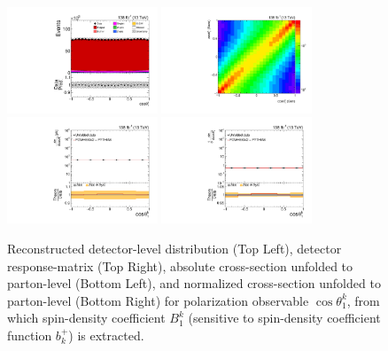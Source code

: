 \clearpage
\begin{figure}[htb]
\begin{center}
 \includegraphics[width=0.40\textwidth]{fig_fullRun2UL/controlplots/combined/Hyp_AntiLeptonBk.pdf}
 \includegraphics[width=0.40\textwidth]{fig_fullRun2UL/unfolding/combined/ResponseMatrix_b1k.pdf} \\
 \includegraphics[width=0.40\textwidth]{fig_fullRun2UL/unfolding/combined/UnfoldedResults_b1k.pdf}
 \includegraphics[width=0.40\textwidth]{fig_fullRun2UL/unfolding/combined/UnfoldedResultsNorm_b1k.pdf} \\
\label{fig:b1k}
\caption{Reconstructed detector-level distribution (Top Left), detector response-matrix (Top Right), absolute cross-section unfolded to parton-level (Bottom Left), and normalized cross-section unfolded to parton-level (Bottom Right) for polarization observable $\cos\theta_{1}^{k}$, from which spin-density coefficient $B_{1}^{k}$ (sensitive to spin-density coefficient function $b_k^{+}$) is extracted.}
\end{center}
\end{figure}
